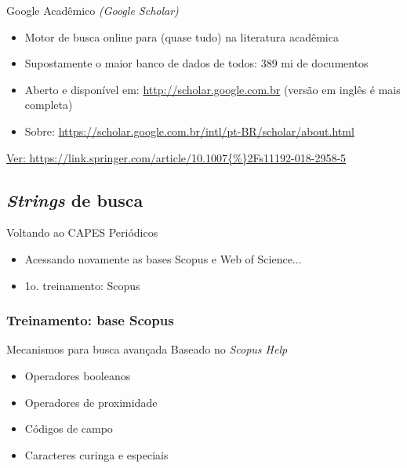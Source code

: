 \begin{frame}{Google Acadêmico \emph{(Google Scholar)}}

\begin{itemize}
\item Motor de busca online para (quase tudo) na literatura acadêmica
\item Supostamente o maior banco de dados de todos: 389 mi de documentos
\item Aberto e disponível em: \url{http://scholar.google.com.br} (versão em inglês é mais completa)
\item Sobre: \url{https://scholar.google.com.br/intl/pt-BR/scholar/about.html}
\end{itemize}
\scriptsize{\url{Ver: https://link.springer.com/article/10.1007{\%}2Fs11192-018-2958-5}}
\end{frame}

\subsection{\emph{Strings} de busca}

\begin{frame}{Voltando ao CAPES Periódicos}
\begin{itemize}
\item Acessando novamente as bases Scopus e Web of Science...
\item 1o. treinamento: Scopus
\end{itemize}
\end{frame}

\subsubsection{Treinamento: base Scopus}

\begin{frame}{Mecanismos para busca avançada}
Baseado no \textit{Scopus Help}
\begin{itemize}
\item Operadores booleanos
\item Operadores de proximidade
\item Códigos de campo 
\item Caracteres curinga e especiais
\end{itemize}
\end{frame}

